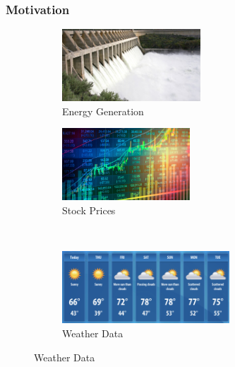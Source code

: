 \documentclass[spanish, aspectratio=169]{beamer}
\begin{document}
	
	
\frame{\titlepage}

\begin{frame}
	\frametitle{Motivation}
	\begin{figure}[htbp]
		\centering
		\begin{subfigure}[t]{0.48\textwidth}
			\centering
			\includegraphics[width=\linewidth,height=2.7cm,keepaspectratio]{figures/hydro_gen.jpeg}
			\caption{Energy Generation}
		\end{subfigure}
		\hfill
		\begin{subfigure}[t]{0.48\textwidth}
			\centering
			\includegraphics[width=\linewidth,height=2.7cm,keepaspectratio]{figures/stock_prices.jpg}
			\caption{Stock Prices}
		\end{subfigure}
		\\[1ex] %
		\begin{subfigure}[t]{0.48\textwidth}
			\centering
			\includegraphics[width=\linewidth,height=2.7cm,keepaspectratio]{figures/weather_data.png}
			\caption{Weather Data}
		\end{subfigure}
	\end{figure}
	
	
\end{frame}
\end{document}
